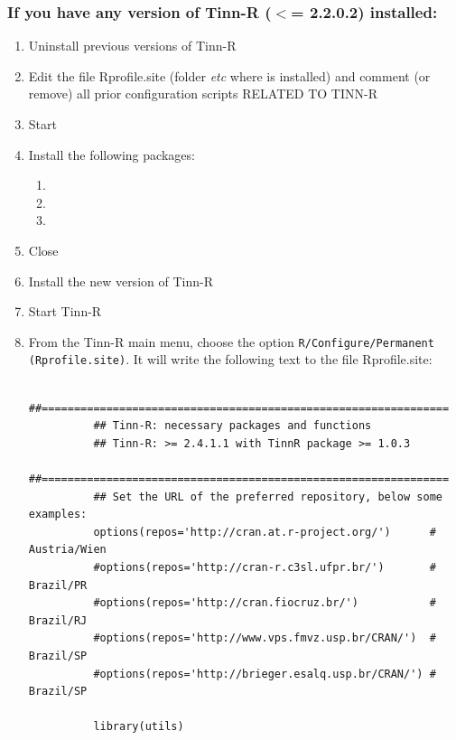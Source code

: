 \subsubsection{If you have any version of Tinn-R ($<$= 2.2.0.2) installed:}

\begin{enumerate}
  \item Uninstall previous versions of Tinn-R
  \item Edit the file Rprofile.site (folder \textit{etc} where
    \RR{} is installed) and comment (or remove) all prior configuration
    scripts RELATED TO TINN-R
  \item Start \RR{}
  \item Install the following packages:
    \begin{enumerate}
      \item {}
      \item {}
      \item {}
    \end{enumerate}
  \item Close \RR{}
  \item Install the new version of Tinn-R
  \item Start Tinn-R
  \item From the Tinn-R main menu, choose the option
    \texttt{R/Configure/Permanent (Rprofile.site)}. It will write the
    following text to the file Rprofile.site:
    {\footnotesize
      {\color {darkred}
        \begin{verbatim}
          ##===============================================================
          ## Tinn-R: necessary packages and functions
          ## Tinn-R: >= 2.4.1.1 with TinnR package >= 1.0.3
          ##===============================================================
          ## Set the URL of the preferred repository, below some examples:
          options(repos='http://cran.at.r-project.org/')      # Austria/Wien
          #options(repos='http://cran-r.c3sl.ufpr.br/')       # Brazil/PR
          #options(repos='http://cran.fiocruz.br/')           # Brazil/RJ
          #options(repos='http://www.vps.fmvz.usp.br/CRAN/')  # Brazil/SP
          #options(repos='http://brieger.esalq.usp.br/CRAN/') # Brazil/SP

          library(utils)


\end{verbatim}}}
\end{enumerate}
